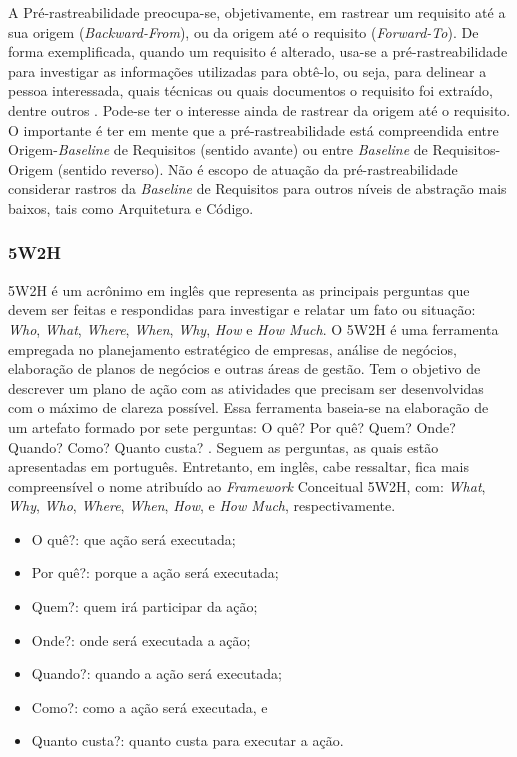 A Pré-rastreabilidade preocupa-se, objetivamente, em rastrear um requisito até a sua origem (\textit{Backward-From}), ou da origem até o requisito (\textit{Forward-To}). De forma exemplificada, quando um requisito é alterado, usa-se a pré-rastreabilidade para investigar as informações utilizadas para obtê-lo, ou seja, para delinear a pessoa interessada, quais técnicas ou quais documentos o requisito foi extraído, dentre outros \cite{pinheiro2004requirements}. Pode-se ter o interesse ainda de rastrear da origem até o requisito. O importante é ter em mente que a pré-rastreabilidade está compreendida entre Origem-\textit{Baseline} de Requisitos (sentido avante) ou entre \textit{Baseline} de Requisitos-Origem (sentido reverso). Não é escopo de atuação da pré-rastreabilidade considerar rastros da \textit{Baseline} de Requisitos para outros níveis de abstração mais baixos, tais como Arquitetura e Código.

\subsubsection{5W2H}

\label{sec:5w2h}

5W2H é um acrônimo em inglês que representa as principais perguntas que devem ser feitas e respondidas para investigar e relatar um fato ou situação: \textit{Who}, \textit{What}, \textit{Where}, \textit{When}, \textit{Why}, \textit{How} e \textit{How Much}. O 5W2H é uma ferramenta empregada no planejamento estratégico de empresas, análise de negócios, elaboração de planos de negócios e outras áreas de gestão. Tem o objetivo de descrever um plano de ação com as atividades que precisam ser desenvolvidas com o máximo de clareza possível. Essa ferramenta baseia-se na elaboração de um artefato formado por sete perguntas: O quê? Por quê? Quem? Onde? Quando? Como? Quanto custa? \cite{rabuskeuso}. Seguem as perguntas, as quais estão apresentadas em português. Entretanto, em inglês, cabe ressaltar, fica mais compreensível o nome atribuído ao \textit{Framework} Conceitual 5W2H, com: \textit{What}, \textit{Why}, \textit{Who}, \textit{Where}, \textit{When}, \textit{How}, e \textit{How Much}, respectivamente.

\begin{itemize}
    \item O quê?: que ação será executada;
    \item Por quê?: porque a ação será executada;
    \item Quem?: quem irá participar da ação;
    \item Onde?: onde será executada a ação;
    \item Quando?: quando a ação será executada;
    \item Como?: como a ação será executada, e
    \item Quanto custa?: quanto custa para executar a ação.
\end{itemize}

